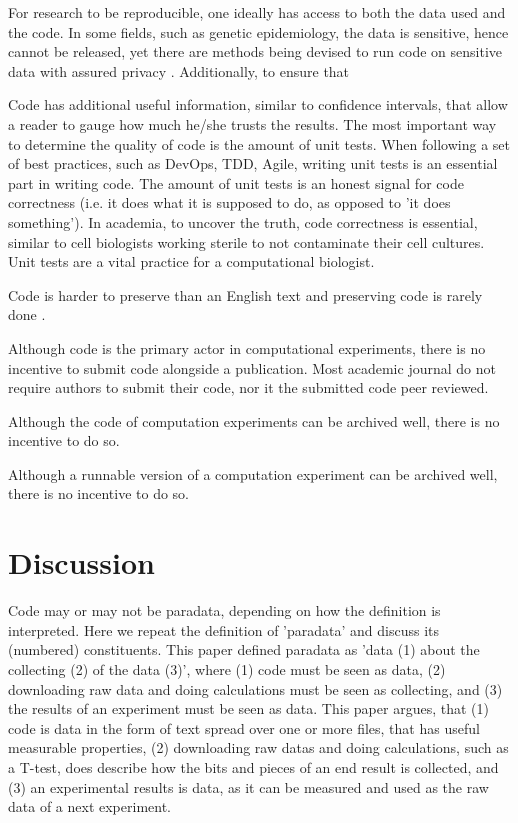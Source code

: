 For research to be reproducible, one ideally has access to
both the data used and the code.
In some fields, such as genetic epidemiology, the data is
sensitive, hence cannot be released,
yet there are methods being devised to run code on sensitive
data with assured privacy \cite{zhang2016review,azencott2018machine}.
Additionally, to ensure that 

Code has additional useful information, similar to confidence intervals,
that allow a reader to gauge how much he/she trusts the results.
The most important way to determine the quality of code
is the amount of unit tests.
When following a set of best practices, such as DevOps, TDD, Agile,
writing unit tests is an essential 
part in writing code.
The amount of unit tests is an honest signal 
for code correctness (i.e. it does what it is supposed to do, as opposed
to 'it does something').
In academia, to uncover the truth, code correctness is essential,
similar to cell biologists working sterile to not contaminate their
cell cultures.
Unit tests are a vital practice for a computational biologist.

Code is harder to preserve than an English text
and preserving code is rarely done \cite{barnes2010publish}.

Although code is the primary actor in computational experiments,
there is no incentive to submit code alongside a publication.
Most academic journal do not require authors to submit their code,
nor it the submitted code peer reviewed.

Although the code of computation experiments can be archived well, 
there is no incentive to do so.

Although a runnable version of a computation experiment can be archived well, 
there is no incentive to do so.

\section{Discussion}


Code may or may not be paradata, depending on how the definition
is interpreted.
Here we repeat the definition of 'paradata' and discuss 
its (numbered) constituents.
This paper defined paradata as 'data (1) about the collecting (2) of the data (3)',
where (1) code must be seen as data, (2) downloading raw data
and doing calculations must be seen as collecting, and (3) the
results of an experiment must be seen as data.
This paper argues, that (1) code is data in the form of text spread
over one or more files, that has useful measurable properties, 
(2) downloading raw datas and doing calculations, such as a T-test,
does describe how the bits and pieces of an end result is collected,
and (3) an experimental results is data, as it can be measured and
used as the raw data of a next experiment.

